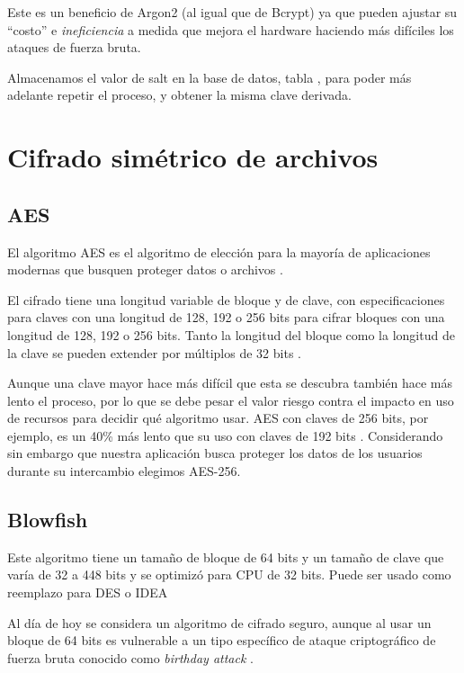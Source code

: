 Este es un beneficio de Argon2 (al igual que de Bcrypt) ya que pueden ajustar
su ``costo'' e \emph{ineficiencia} a medida que mejora el hardware haciendo más 
difíciles los ataques de fuerza bruta.

Almacenamos el valor de salt en la base de datos, tabla , para
poder más adelante repetir el proceso, y obtener la misma clave derivada.


\section{Cifrado simétrico de archivos}

\subsection{AES}\label{secc:aes}

El algoritmo AES es el algoritmo de elección para la mayoría de aplicaciones 
modernas que busquen proteger datos o archivos \autocite{cryptomathic-aes}.

El cifrado tiene una longitud variable de bloque y de clave, con
especificaciones para claves con una longitud de 128, 192 o 256 bits para cifrar 
bloques con una longitud de 128, 192 o 256 bits. Tanto la longitud del bloque 
como la longitud de la clave se pueden extender por 
múltiplos de 32 bits \cite{coulouris}.

Aunque una clave mayor hace más difícil que esta se descubra también hace más
lento el proceso, por lo que se debe pesar el valor riesgo contra el impacto
en uso de recursos para decidir qué algoritmo usar.
AES con claves de 256 bits, por ejemplo, es un 40\% más lento que su uso con claves
de 192 bits \autocite{solarwinds-aes}.
Considerando sin embargo que nuestra aplicación busca proteger los datos de los
usuarios durante su intercambio elegimos AES-256.

\subsection{Blowfish}\label{secc:blowfish}

Este algoritmo tiene un tamaño de bloque de 64 bits y un tamaño de clave que 
varía de 32 a 448 bits y se optimizó para CPU de 32 bits. Puede ser usado como 
reemplazo para DES o IDEA \cite{schneier}

Al día de hoy se considera un algoritmo de cifrado seguro, aunque al usar un 
bloque de 64 bits es vulnerable a un tipo específico de ataque criptográfico 
de fuerza bruta conocido como \emph{birthday attack} \cite{geeksBlowfish}.

